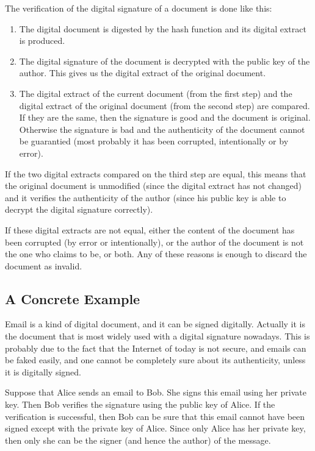 \documentclass[a4paper]{article}
\begin{document}
The verification of the digital signature of a document is done like
this:
\begin{enumerate}
  \item The digital document is digested by the hash function and its
    digital extract is produced.
  \item The digital signature of the document is decrypted with the
    public key of the author. This gives us the digital extract of the
    original document.
  \item The digital extract of the current document (from the first
    step) and the digital extract of the original document (from the
    second step) are compared. If they are the same, then the
    signature is good and the document is original. Otherwise the
    signature is bad and the authenticity of the document cannot be
    guarantied (most probably it has been corrupted, intentionally or
    by error).
\end{enumerate}

If the two digital extracts compared on the third step are equal, this
means that the original document is unmodified (since the digital
extract has not changed) and it verifies the authenticity of the
author (since his public key is able to decrypt the digital signature
correctly).

If these digital extracts are not equal, either the content of the
document has been corrupted (by error or intentionally), or the author
of the document is not the one who claims to be, or both. Any of these
reasons is enough to discard the document as invalid.

\subsection{A Concrete Example}

Email is a kind of digital document, and it can be signed digitally.
Actually it is the document that is most widely used with a digital
signature nowadays. This is probably due to the fact that the Internet
of today is not secure, and emails can be faked easily, and one cannot
be completely sure about its authenticity, unless it is digitally
signed.

Suppose that Alice sends an email to Bob. She signs this email using
her private key. Then Bob verifies the signature using the public key
of Alice. If the verification is successful, then Bob can be sure
that this email cannot have been signed except with the private key of
Alice.  Since only Alice has her private key, then only she can be the
signer (and hence the author) of the message.
\end{document}
